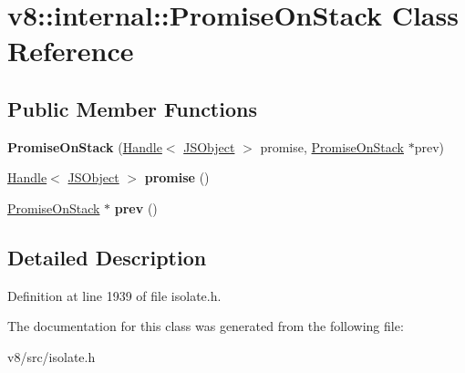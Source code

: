 \hypertarget{classv8_1_1internal_1_1PromiseOnStack}{}\section{v8\+:\+:internal\+:\+:Promise\+On\+Stack Class Reference}
\label{classv8_1_1internal_1_1PromiseOnStack}
\subsection*{Public Member Functions}
\begin{DoxyCompactItemize}
\item 
\mbox{\label{classv8_1_1internal_1_1PromiseOnStack_a231c1eb2f3e92d206e4c45aa510cf1b4}} 
{\bfseries Promise\+On\+Stack} (\mbox{\hyperlink{classv8_1_1internal_1_1Handle}{Handle}}$<$ \mbox{\hyperlink{classv8_1_1internal_1_1JSObject}{J\+S\+Object}} $>$ promise, \mbox{\hyperlink{classv8_1_1internal_1_1PromiseOnStack}{Promise\+On\+Stack}} $\ast$prev)
\item 
\mbox{\label{classv8_1_1internal_1_1PromiseOnStack_ae7cce8bf18b81022392d3194232d6600}} 
\mbox{\hyperlink{classv8_1_1internal_1_1Handle}{Handle}}$<$ \mbox{\hyperlink{classv8_1_1internal_1_1JSObject}{J\+S\+Object}} $>$ {\bfseries promise} ()
\item 
\mbox{\label{classv8_1_1internal_1_1PromiseOnStack_a520700e3bc23ba52968129f8540b2984}} 
\mbox{\hyperlink{classv8_1_1internal_1_1PromiseOnStack}{Promise\+On\+Stack}} $\ast$ {\bfseries prev} ()
\end{DoxyCompactItemize}


\subsection{Detailed Description}


Definition at line 1939 of file isolate.\+h.



The documentation for this class was generated from the following file\+:\begin{DoxyCompactItemize}
\item 
v8/src/isolate.\+h\end{DoxyCompactItemize}
